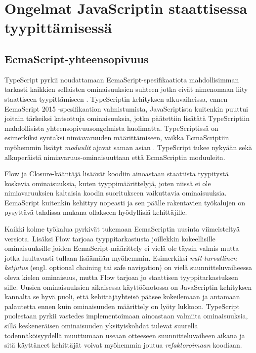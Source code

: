 \chapter{Ongelmat JavaScriptin staattisessa tyypittämisessä}

\section{EcmaScript-yhteensopivuus}
TypeScript pyrkii
nou\-dat\-ta\-maan Ecma\-Script-spe\-si\-fi\-kaa\-ti\-o\-ta mah\-dol\-li\-sim\-man
tar\-kas\-ti kaik\-ki\-en sellaisten ominaisuuksien suhteen jotka eivät nimenomaan
liity staattiseen tyypittämiseen \cite{TypeScript_DesignGoals}. TypeScriptin
kehityksen alkuvaiheissa, ennen EcmaScript 2015 -spe\-si\-fi\-kaa\-ti\-on valmistumista,
JavaScriptista kuitenkin puuttui joitain tärkeiksi katsottuja ominaisuuksia,
jotka päätettiin lisätätä TypeScriptiin mahdollisista yh\-teen\-so\-pi\-vuus\-ongel\-mi\-sta
huolimatta. TypeScrip\-tis\-sä on esimerkiksi syntaksi ni\-mi\-a\-va\-ruu\-den määrittämiseen,
vaikka EcmaScriptiin myöhemmin lisätyt \textit{moduulit} ajavat saman asian
\cite{TypeScript_issuecomment_esnextfeatures}. TypeScript tukee nykyään sekä
alkuperäistä ni\-mi\-a\-va\-ruus-o\-mi\-nai\-suut\-taan että EcmaScriptin moduuleita.

Flow ja Closure-kääntäjä lisäävät koodiin ainoastaan staattista tyypitystä
koskevia ominaisuuksia, kuten tyyppimäärittelyjä, joten niissä ei ole
nimiavaruuksien kaltaisia koodin suoritukseen vaikuttavia ominaisuuksia.
EcmaScript kuitenkin kehittyy nopeasti ja sen päälle rakentavien työkalujen
on pysyttävä tahdissa mukana ollakseen hyödyllisiä kehittäjille.

Kaikki kolme työkalua pyrkivät tukemaan EcmaScriptin uusinta viimeisteltyä
versiota. Lisäksi Flow tarjoaa tyyppitarkastusta joillekkin kokeellisille
ominaisuuksille joiden EcmaScript-määrittely ei vielä ole täysin valmis mutta
jotka luultavasti tullaan lisäämään myöhemmin. Esimerkiksi
\textit{null-turvallinen ketjutus} (engl. optional chaining tai safe navigation)
\cite{Optional_Chaining_proposal} on vielä
suunnitteluvaiheessa oleva kielen ominaisuus, mutta Flow tarjoaa jo
staattisen tyyppitarkastuksen sille. Uusien ominaisuuksien aikaisessa
käyttöönotossa on JavaScriptin kehityksen kannalta se hyvä puoli, että
kehittäjäyhteisö pääsee kokeilemaan ja antamaan palautetta ennen kuin ominaisuuden
määrittely on lyöty lukkoon. TypeScript puolestaan pyrkii vastedes implementoimaan
ainoastaan valmiita ominaisuuksia, sillä keskeneräisen ominaisuuden yksityiskohdat
tulevat suurella todennäköisyydellä muuttumaan useaan otteeseen suunnitteluvaiheen
aikana ja sitä käyttäneet kehittäjät voivat myöhemmin joutua
\textit{refaktoroimaan} koodiaan.

